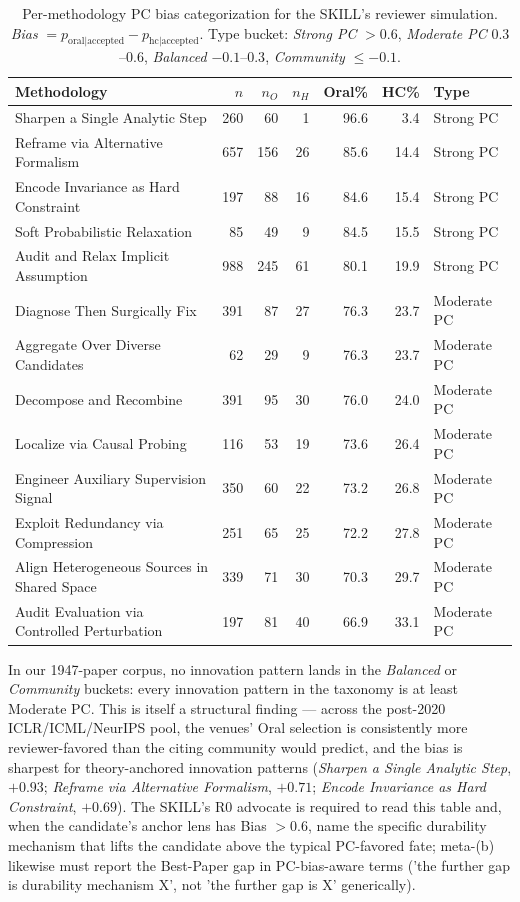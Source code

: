 \documentclass[10pt,a4paper]{article}
\begin{document}
\begin{table}[htbp]
\centering
\caption{Per-methodology PC bias categorization for the SKILL's reviewer simulation. \emph{Bias} $= p_\text{oral|accepted} - p_\text{hc|accepted}$. Type bucket: \emph{Strong PC} $> 0.6$, \emph{Moderate PC} $0.3$--$0.6$, \emph{Balanced} $-0.1$--$0.3$, \emph{Community} $\leq -0.1$.}
\label{tab:pc-bias-types}
\small
\begin{tabular}{p{5.4cm} rrr rr l}
\toprule
\textbf{Methodology} & $n$ & $n_O$ & $n_H$ & \textbf{Oral\%} & \textbf{HC\%} & \textbf{Type} \\
\midrule
Sharpen a Single Analytic Step & 260 & 60 & 1 & 96.6 & 3.4 & Strong PC \\
Reframe via Alternative Formalism & 657 & 156 & 26 & 85.6 & 14.4 & Strong PC \\
Encode Invariance as Hard Constraint & 197 & 88 & 16 & 84.6 & 15.4 & Strong PC \\
Soft Probabilistic Relaxation &  85 & 49 &  9 & 84.5 & 15.5 & Strong PC \\
Audit and Relax Implicit Assumption & 988 & 245 & 61 & 80.1 & 19.9 & Strong PC \\
Diagnose Then Surgically Fix & 391 & 87 & 27 & 76.3 & 23.7 & Moderate PC \\
Aggregate Over Diverse Candidates &  62 & 29 &  9 & 76.3 & 23.7 & Moderate PC \\
Decompose and Recombine & 391 & 95 & 30 & 76.0 & 24.0 & Moderate PC \\
Localize via Causal Probing & 116 & 53 & 19 & 73.6 & 26.4 & Moderate PC \\
Engineer Auxiliary Supervision Signal & 350 & 60 & 22 & 73.2 & 26.8 & Moderate PC \\
Exploit Redundancy via Compression & 251 & 65 & 25 & 72.2 & 27.8 & Moderate PC \\
Align Heterogeneous Sources in Shared Space & 339 & 71 & 30 & 70.3 & 29.7 & Moderate PC \\
Audit Evaluation via Controlled Perturbation & 197 & 81 & 40 & 66.9 & 33.1 & Moderate PC \\
\bottomrule
\end{tabular}
\end{table}

In our 1947-paper corpus, no innovation pattern lands in the \emph{Balanced} or \emph{Community} buckets: every innovation pattern in the taxonomy is at least Moderate PC. This is itself a structural finding --- across the post-2020 ICLR/ICML/NeurIPS pool, the venues' Oral selection is consistently more reviewer-favored than the citing community would predict, and the bias is sharpest for theory-anchored innovation patterns (\emph{Sharpen a Single Analytic Step}, $+0.93$; \emph{Reframe via Alternative Formalism}, $+0.71$; \emph{Encode Invariance as Hard Constraint}, $+0.69$). The SKILL's R0 advocate is required to read this table and, when the candidate's anchor lens has Bias $> 0.6$, name the specific durability mechanism that lifts the candidate above the typical PC-favored fate; meta-(b) likewise must report the Best-Paper gap in PC-bias-aware terms ('the further gap is durability mechanism X', not 'the further gap is X' generically).
\end{document}

